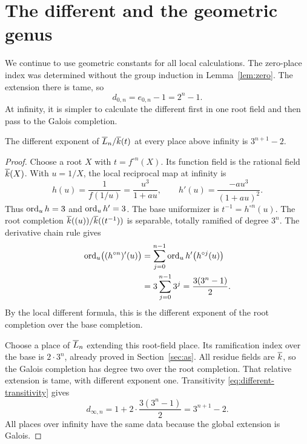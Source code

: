 \section{The different and the geometric genus}\label{sec:ramification}

We continue to use geometric constants for all local calculations.
The zero-place index was determined without the group induction in
Lemma~\ref{lem:zero}. The extension there is tame, so
\[
 d_{0,n}=e_{0,n}-1=2^n-1.
\]
At infinity, it is simpler to calculate the different first in
one root field and then pass to the Galois completion.

\begin{proposition}\label{prop:different}
The different exponent of $\overline{L}_n/\overline{k}(t)$ at every place
above infinity is $3^{n+1}-2$.
\end{proposition}

\begin{proof}
Choose a root $X$ with $t=f^{\circ n}(X)$. Its function field
is the rational field $\overline{k}(X)$. With $u=1/X$, the local
reciprocal map at infinity is
\[
 h(u)=\frac1{f(1/u)}=\frac{u^3}{1+au},
 \qquad h'(u)=\frac{-au^3}{(1+au)^2}.
\]
Thus $\operatorname{ord}_u h=3$ and $\operatorname{ord}_u h'=3$.
The base uniformizer is $t^{-1}=h^{\circ n}(u)$.
The root completion $\overline{k}((u))/\overline{k}((t^{-1}))$ is separable,
totally ramified of degree $3^n$. The derivative chain rule gives
\begin{align}
 \operatorname{ord}_u\bigl((h^{\circ n})'(u)\bigr)
   &=\sum_{j=0}^{n-1}\operatorname{ord}_u h'\bigl(h^{\circ j}(u)\bigr)\notag\\
   &=3\sum_{j=0}^{n-1}3^j
     =\frac{3(3^n-1)}2.\label{eq:root-different}
\end{align}
By the local different formula, this is the different exponent
of the root completion over the base completion.

Choose a place of $\overline{L}_n$ extending this root-field place.
Its ramification index over the base is $2\cdot3^n$, already
proved in Section~\ref{sec:as}. All residue fields are $\overline{k}$,
so the Galois completion has degree two over the root completion.
That relative extension is tame, with different exponent one.
Transitivity \eqref{eq:different-transitivity} gives
\[
 d_{\infty,n}
  =1+2\cdot\frac{3(3^n-1)}2
  =3^{n+1}-2.
\]
All places over infinity have the same data because the global
extension is Galois.
\end{proof}

